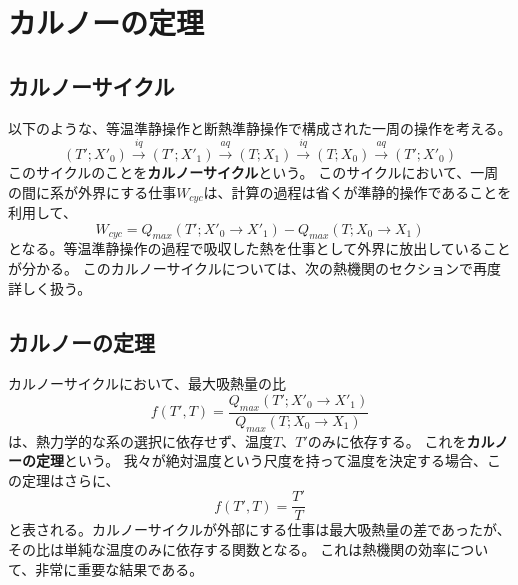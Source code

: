 \documentclass[a4paper]{jsreport}
\begin{document}
        \section{カルノーの定理}
            \subsection*{カルノーサイクル}
                以下のような、等温準静操作と断熱準静操作で構成された一周の操作を考える。
                \begin{equation}
                    (T'; X'_0) \xrightarrow{iq} (T'; X'_1) \xrightarrow{aq} (T; X_1) \xrightarrow{iq} (T; X_0) \xrightarrow{aq} (T'; X'_0)
                \end{equation}
                このサイクルのことを\textbf{カルノーサイクル}という。
                このサイクルにおいて、一周の間に系が外界にする仕事$W_{cyc}$は、計算の過程は省くが準静的操作であることを利用して、
                \begin{equation}
                    W_{cyc} = Q_{max}(T'; X'_0 \xrightarrow{} X'_1) - Q_{max}(T; X_0 \xrightarrow{} X_1)
                \end{equation}
                となる。等温準静操作の過程で吸収した熱を仕事として外界に放出していることが分かる。
                このカルノーサイクルについては、次の熱機関のセクションで再度詳しく扱う。

            \subsection*{カルノーの定理}
                カルノーサイクルにおいて、最大吸熱量の比
                \begin{equation}
                    f(T', T) = \frac{Q_{max}(T'; X'_0 \xrightarrow{} X'_1)}{Q_{max}(T; X_0 \xrightarrow{} X_1)}
                \end{equation}
                は、熱力学的な系の選択に依存せず、温度$T$、$T'$のみに依存する。
                これを\textbf{カルノーの定理}という。
                我々が絶対温度という尺度を持って温度を決定する場合、この定理はさらに、
                \begin{equation}
                    f(T', T) = \frac{T'}{T}
                \end{equation}
                と表される。カルノーサイクルが外部にする仕事は最大吸熱量の差であったが、その比は単純な温度のみに依存する関数となる。
                これは熱機関の効率について、非常に重要な結果である。
\end{document}
